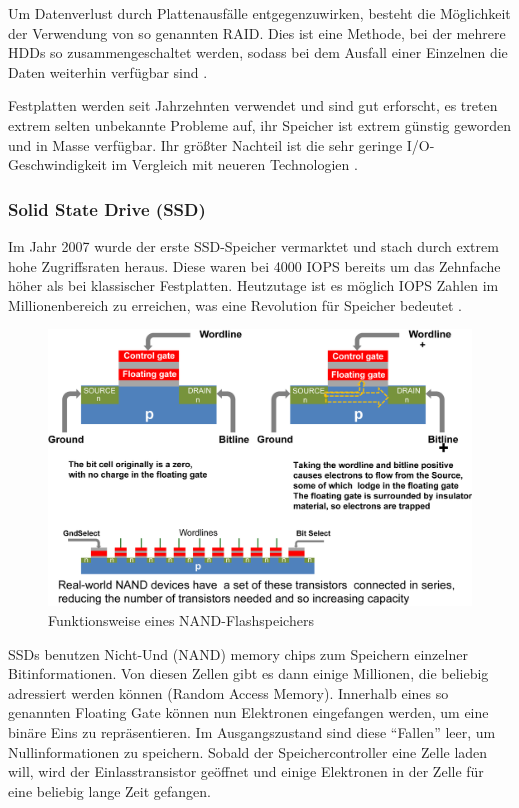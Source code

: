Um Datenverlust durch Plattenausfälle entgegenzuwirken, besteht die Möglichkeit der Verwendung von so genannten \acs{RAID}. Dies ist eine Methode, bei der mehrere HDDs so zusammengeschaltet werden, sodass bei dem Ausfall einer Einzelnen die Daten weiterhin verfügbar sind \parencite{wikibooks.2016}.

Festplatten werden seit Jahrzehnten verwendet und sind gut erforscht, es treten extrem selten unbekannte Probleme auf, ihr Speicher ist extrem günstig geworden und in Masse verfügbar. Ihr größter Nachteil ist die sehr geringe I/O-Geschwindigkeit im Vergleich mit neueren Technologien \parencite[Kap. 3]{kaufmann.2016}.

\subsubsection{Solid State Drive (SSD)}

Im Jahr 2007 wurde der erste \acs{SSD}-Speicher vermarktet und stach durch extrem hohe Zugriffsraten heraus. Diese waren bei 4000 \gls{IOPS} bereits um das Zehnfache höher als bei klassischer Festplatten. Heutzutage ist es möglich IOPS Zahlen im Millionenbereich zu erreichen, was eine Revolution für Speicher bedeutet \parencite[Kap. 3]{kaufmann.2016}.

\begin{figure}[hbt]
	\centering
	\includegraphics[scale=0.85]{images/flash}
	\caption{Funktionsweise eines NAND-Flashspeichers \parencite{kaufmann.2016}}
	\label{fig:flash}
\end{figure}

\acsp{SSD} benutzen Nicht-Und (NAND) memory chips zum Speichern einzelner Bitinformationen. Von diesen Zellen gibt es dann einige Millionen, die beliebig adressiert werden können (Random Access Memory). Innerhalb eines so genannten Floating Gate können nun Elektronen eingefangen werden, um eine binäre Eins zu repräsentieren. Im Ausgangszustand sind diese ``Fallen'' leer, um Nullinformationen zu speichern. Sobald der Speichercontroller eine Zelle laden will, wird der Einlasstransistor geöffnet und einige Elektronen in der Zelle für eine beliebig lange Zeit gefangen.

